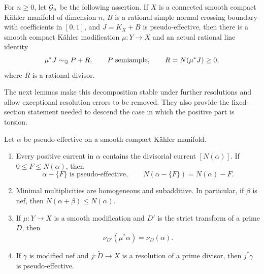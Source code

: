 \begin{definition}\label{def:good-decomposition}
For \(n\geq0\), let \(\mathcal G_n\) be the following assertion. If \(X\)
is a connected smooth compact Kähler manifold of dimension \(n\), \(B\)
is a rational simple normal crossing boundary with coefficients in
\([0,1]\), and \(J=K_X+B\) is pseudo-effective, then there is a smooth
compact Kähler modification \(\mu:Y\to X\) and an actual rational line
identity
\begin{equation}\label{bir:good-decomposition}
 \mu^*J\sim_{\mathbb Q}P+R,
 \qquad P\text{ semiample},\qquad R=N(\mu^*J)\geq0,
\end{equation}
where \(R\) is a rational divisor.
\end{definition}

The next lemmas make this decomposition stable under further resolutions
and allow exceptional resolution errors to be removed. They also provide
the fixed-section statement needed to descend the case in which the
positive part is torsion.

\begin{lemma}\label{bir:calculus}
Let \(\alpha\) be pseudo-effective on a smooth compact Kähler manifold.
\begin{enumerate}
\item Every positive current in \(\alpha\) contains the divisorial current
\([N(\alpha)]\). If \(0\leq F\leq N(\alpha)\), then
\[
 \alpha-\{F\}\text{ is pseudo-effective},\qquad
 N(\alpha-\{F\})=N(\alpha)-F.
\]
\item Minimal multiplicities are homogeneous and subadditive. In
particular, if \(\beta\) is nef, then
\(N(\alpha+\beta)\leq N(\alpha)\).
\item If \(\mu:Y\to X\) is a smooth modification and \(D'\) is the strict
transform of a prime \(D\), then
\[
 \nu_{D'}(\mu^*\alpha)=\nu_D(\alpha).
\]
\item If \(\gamma\) is modified nef and \(j:\widetilde D\to X\) is a
resolution of a prime divisor, then \(j^*\gamma\) is pseudo-effective.
\end{enumerate}
\end{lemma}

